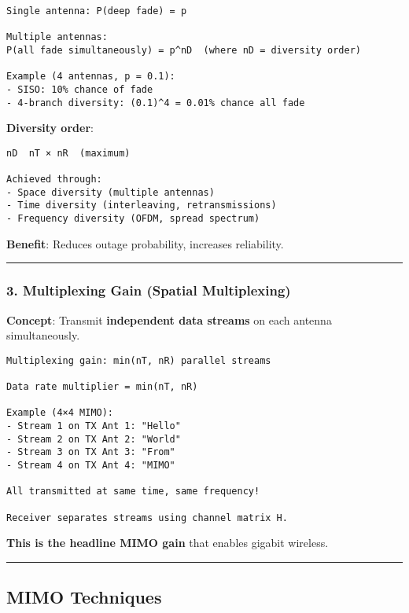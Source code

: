 \begin{verbatim}
Single antenna: P(deep fade) = p

Multiple antennas:
P(all fade simultaneously) = p^nD  (where nD = diversity order)

Example (4 antennas, p = 0.1):
- SISO: 10% chance of fade
- 4-branch diversity: (0.1)^4 = 0.01% chance all fade
\end{verbatim}

\textbf{Diversity order}:

\begin{verbatim}
nD  nT × nR  (maximum)

Achieved through:
- Space diversity (multiple antennas)
- Time diversity (interleaving, retransmissions)
- Frequency diversity (OFDM, spread spectrum)
\end{verbatim}

\textbf{Benefit}: Reduces outage probability, increases reliability.

\begin{center}\rule{0.5\linewidth}{0.5pt}\end{center}

\subsubsection{3. Multiplexing Gain (Spatial
Multiplexing)}\label{multiplexing-gain-spatial-multiplexing}

\textbf{Concept}: Transmit \textbf{independent data streams} on each
antenna simultaneously.

\begin{verbatim}
Multiplexing gain: min(nT, nR) parallel streams

Data rate multiplier = min(nT, nR)

Example (4×4 MIMO):
- Stream 1 on TX Ant 1: "Hello"
- Stream 2 on TX Ant 2: "World"
- Stream 3 on TX Ant 3: "From"
- Stream 4 on TX Ant 4: "MIMO"

All transmitted at same time, same frequency!

Receiver separates streams using channel matrix H.
\end{verbatim}

\textbf{This is the headline MIMO gain} that enables gigabit wireless.

\begin{center}\rule{0.5\linewidth}{0.5pt}\end{center}

\subsection{\texorpdfstring{ MIMO
Techniques}{ MIMO Techniques}}\label{mimo-techniques}

